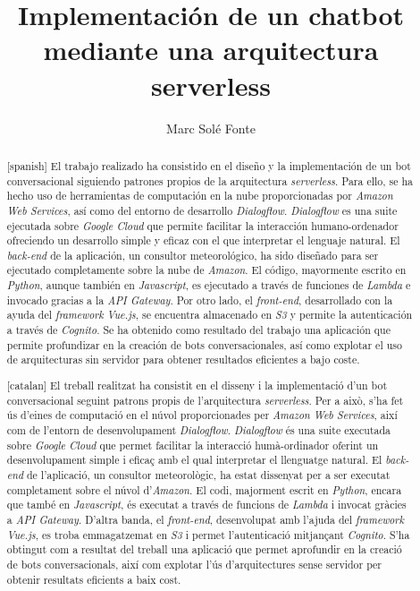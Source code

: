 \documentclass[11pt,spanish,listoffigures]{tfgetsinf}
\title{Implementación de un chatbot mediante una arquitectura serverless}
\author{Marc Solé Fonte}
\begin{document}

\begin{abstract}[spanish]
El trabajo realizado ha consistido en el diseño y la implementación de un bot conversacional siguiendo patrones propios de la arquitectura  \textit{serverless}. Para ello, se ha hecho uso de herramientas de computación en la nube proporcionadas por  \textit{Amazon Web Services}, así como del entorno de desarrollo  \textit{Dialogflow}. \textit{Dialogflow} es una suite ejecutada sobre  \textit{Google Cloud} que permite facilitar la interacción humano-ordenador ofreciendo un desarrollo simple y eficaz con el que interpretar el lenguaje natural. El \textit{back-end} de la aplicación, un consultor meteorológico, ha sido diseñado para ser ejecutado completamente sobre la nube de \textit{Amazon}. El código, mayormente escrito en  \textit{Python}, aunque también en  \textit{Javascript}, es ejecutado a través de funciones de \textit{Lambda} e invocado gracias a la \textit{API Gateway}. Por otro lado, el \textit{front-end}, desarrollado con la ayuda del \textit{framework}  \textit{Vue.js}, se encuentra almacenado en  \textit{S3} y permite la autenticación a través de  \textit{Cognito}. Se ha obtenido como resultado del trabajo una aplicación que permite profundizar en la creación de bots conversacionales, así como explotar el uso de arquitecturas sin servidor para obtener resultados eficientes a bajo coste.
\end{abstract}
\begin{abstract}[catalan]
El treball realitzat ha consistit en el disseny i la implementació d'un bot conversacional seguint patrons propis de l'arquitectura \textit{serverless}. Per a això, s'ha fet ús d'eines de computació en el núvol proporcionades per \textit{Amazon Web Services}, així com de l'entorn de desenvolupament \textit{Dialogflow}. \textit{Dialogflow} és una suite executada sobre \textit{Google Cloud} que permet facilitar la interacció humà-ordinador oferint un desenvolupament simple i eficaç amb el qual interpretar el llenguatge natural. El \textit{back-end} de l'aplicació, un consultor meteorològic, ha estat dissenyat per a ser executat completament sobre el núvol d'\textit{Amazon}. El codi, majorment escrit en \textit{Python}, encara que també en \textit{Javascript}, és executat a través de funcions de \textit{Lambda} i invocat gràcies a \textit{API Gateway}. D'altra banda, el \textit{front-end}, desenvolupat amb l'ajuda del \textit{framework} \textit{Vue.js}, es troba emmagatzemat en \textit{S3} i permet l'autenticació mitjançant \textit{Cognito}. S'ha obtingut com a resultat del treball una aplicació que permet aprofundir en la creació de bots conversacionals, així com explotar l'ús d'arquitectures sense servidor per obtenir resultats eficients a baix cost.
\end{abstract}
\end{document}
